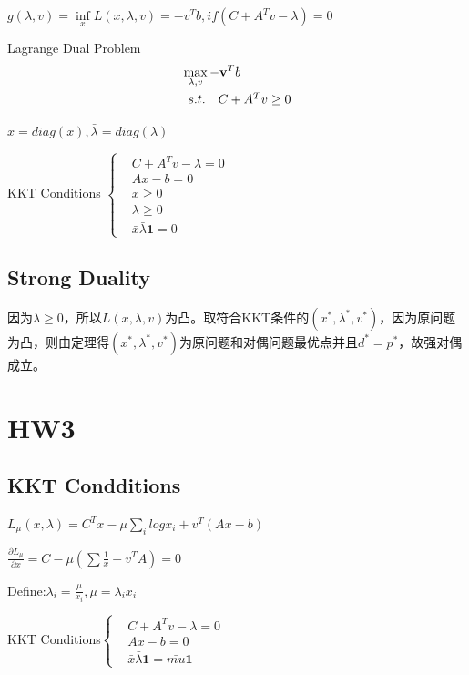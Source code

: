 \documentclass{xjtureport}
\begin{document}
$g(\lambda,v)= \mathop{inf}\limits_{x} L(x,\lambda,v) = -v^{T}b, if (C + A^{T}v-\lambda) = 0$

Lagrange Dual Problem
\begin{equation}
    \begin{aligned} \label{P}
        & \max_{\lambda,v} -\textbf{v}^{T}b\\
        &\begin{array}[]{r@{\quad}r@{}l@{\quad}l}
        s.t.& C+A^{T}v \geq 0\\
        \end{array}
    \end{aligned}
\end{equation}

$\bar{x} = diag(x),\bar{\lambda} = diag(\lambda)$

KKT Conditions
$\left\{
    \begin{matrix}
    &  C+A^{T}v -\lambda = 0 \\ 
    &  Ax -b = 0 \\ 
    &  x \geq 0 \\ 
    &  \lambda \geq 0 \\ 
    &   \bar{x}\bar{\lambda}\textbf{1}= 0
\end{matrix}
\right.$

\subsection{Strong Duality}
因为$\lambda \geq 0$，所以$L(x,\lambda,v)$为凸。取符合KKT条件的$(x^{*},\lambda^{*},v^{*})$，因为原问题为凸，则由定理得$(x^{*},\lambda^{*},v^{*})$为原问题和对偶问题最优点并且$d^{*} = p^{*}$，故强对偶成立。

\section{HW3}

\subsection{KKT Condditions}

$L_{\mu} (x,\lambda) = C^{T}x - \mu \sum_{i} log x_{i} +v^{T}(Ax-b)$

$\frac{\partial L_{\mu}}{\partial x} = C - \mu(\sum \frac{1}{x} + v^{T}A) = 0$


Define:$\lambda_{i} = \frac{\mu}{x_{i}}, \mu = \lambda_{i}x_{i}$

KKT Conditions$\left\{\begin{matrix}
    &  C+A^{T}v -\lambda = 0 \\ 
    &  Ax -b = 0 \\ 
    &   \bar{x}\bar{\lambda}\textbf{1}= \bar{mu} \textbf{1}
   \end{matrix}\right.$
\end{document}
